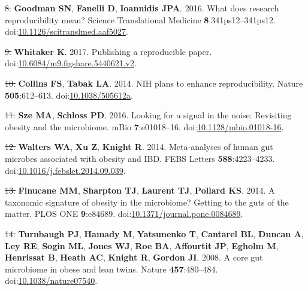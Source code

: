 \documentclass[]{article}
\providecommand{\DIFaddtex}[1]{{\protect\color{blue}\uwave{#1}}} %
\providecommand{\DIFdeltex}[1]{{\protect\color{red}\sout{#1}}}                      %
\providecommand{\DIFaddbegin}{} %
\providecommand{\DIFaddend}{} %
\providecommand{\DIFdelbegin}{} %
\providecommand{\DIFdelend}{} %
\providecommand{\DIFadd}[1]{\texorpdfstring{\DIFaddtex{#1}}{#1}} %
\providecommand{\DIFdel}[1]{\texorpdfstring{\DIFdeltex{#1}}{}} %
\begin{document}
\hypertarget{ref-Goodman2016}{}
\DIFdelbegin \DIFdel{8. }\DIFdelend \DIFaddbegin \DIFadd{9. }\DIFaddend \textbf{Goodman SN}, \textbf{Fanelli D}, \textbf{Ioannidis JPA}.
2016. What does research reproducibility mean? Science Translational
Medicine \textbf{8}:341ps12--341ps12.
doi:\href{https://doi.org/10.1126/scitranslmed.aaf5027}{10.1126/scitranslmed.aaf5027}.

\hypertarget{ref-Whitaker2017}{}
\DIFdelbegin \DIFdel{9. }\DIFdelend \DIFaddbegin \DIFadd{10. }\DIFaddend \textbf{Whitaker K}. 2017. Publishing a reproducible paper.
doi:\href{https://doi.org/10.6084/m9.figshare.5440621.v2}{10.6084/m9.figshare.5440621.v2}.

\hypertarget{ref-Collins2014}{}
\DIFdelbegin \DIFdel{10. }\DIFdelend \DIFaddbegin \DIFadd{11. }\DIFaddend \textbf{Collins FS}, \textbf{Tabak LA}. 2014. NIH plans to enhance
reproducibility. Nature \textbf{505}:612--613.
doi:\href{https://doi.org/10.1038/505612a}{10.1038/505612a}.

\hypertarget{ref-Sze2016}{}
\DIFdelbegin \DIFdel{11. }\DIFdelend \DIFaddbegin \DIFadd{12. }\DIFaddend \textbf{Sze MA}, \textbf{Schloss PD}. 2016. Looking for a signal in
the noise: Revisiting obesity and the microbiome. mBio
\textbf{7}:e01018--16.
doi:\href{https://doi.org/10.1128/mbio.01018-16}{10.1128/mbio.01018-16}.

\hypertarget{ref-Walters2014}{}
\DIFdelbegin \DIFdel{12. }\DIFdelend \DIFaddbegin \DIFadd{13. }\DIFaddend \textbf{Walters WA}, \textbf{Xu Z}, \textbf{Knight R}. 2014.
Meta-analyses of human gut microbes associated with obesity and IBD.
FEBS Letters \textbf{588}:4223--4233.
doi:\href{https://doi.org/10.1016/j.febslet.2014.09.039}{10.1016/j.febslet.2014.09.039}.

\hypertarget{ref-Finucane2014}{}
\DIFdelbegin \DIFdel{13. }\DIFdelend \DIFaddbegin \DIFadd{14. }\DIFaddend \textbf{Finucane MM}, \textbf{Sharpton TJ}, \textbf{Laurent TJ},
\textbf{Pollard KS}. 2014. A taxonomic signature of obesity in the
microbiome? Getting to the guts of the matter. PLOS ONE
\textbf{9}:e84689.
doi:\href{https://doi.org/10.1371/journal.pone.0084689}{10.1371/journal.pone.0084689}.

\hypertarget{ref-Turnbaugh2008}{}
\DIFdelbegin \DIFdel{14. }\DIFdelend \DIFaddbegin \DIFadd{15. }\DIFaddend \textbf{Turnbaugh PJ}, \textbf{Hamady M}, \textbf{Yatsunenko T},
\textbf{Cantarel BL}, \textbf{Duncan A}, \textbf{Ley RE}, \textbf{Sogin
ML}, \textbf{Jones WJ}, \textbf{Roe BA}, \textbf{Affourtit JP},
\textbf{Egholm M}, \textbf{Henrissat B}, \textbf{Heath AC},
\textbf{Knight R}, \textbf{Gordon JI}. 2008. A core gut microbiome in
obese and lean twins. Nature \textbf{457}:480--484.
doi:\href{https://doi.org/10.1038/nature07540}{10.1038/nature07540}.
\end{document}
